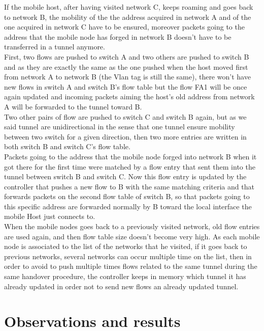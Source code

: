 \documentclass{article}
\begin{document}
If the mobile host, after having visited network C, keeps roaming and
goes back to network B, the mobility of the the address acquired in
network A and of the one acquired in network C have to be ensured,
moreover packets going to the address that the mobile node has forged
in network B doesn't have to be transferred in a tunnel anymore.\\
\newline
First, two flows are pushed to switch A and two others are pushed to
switch B and as they are exactly the same as the one pushed when the
host moved first from network A to network B (the Vlan tag is still
the same), there won't have new flows in switch A and switch B's flow
table but the flow FA1 will be once again updated and incoming
packets aiming the host's old address from network A will be
forwarded to the tunnel toward B.\\
\newline
Two other pairs of flow are pushed to switch C and switch B again,
but as we said tunnel are unidirectional in the sense that one
tunnel ensure mobility between two switch for a given direction, then
two more entries are written in both switch B and switch C's flow
table.\\
\newline
Packets going to the address that the mobile node forged into network
B when it got there for the first time were matched by a flow entry
that sent them into the tunnel between switch B and switch C. Now
this flow entry is updated by the controller that pushes a new flow to
B with the same matching criteria and that forwards packets on the
second flow table of switch B, so that packets going to this specific
address are forwarded normally by B toward the local interface the
mobile Host just connects to. \\
\newline
When the mobile nodes goes back to a previously visited network, old
flow entries are used again, and then flow table size doesn't become
very high. As each mobile node is associated to the list of the
networks that he visited, if it goes back to previous networks,
several networks can occur multiple time on the list, then in order to
avoid to push multiple times flows related to the same tunnel during
the same handover procedure, the controller keeps in memory which
tunnel it has already updated in order not to send new flows an
already updated tunnel.\\
\newline
\section{Observations and results} 
\end{document}
